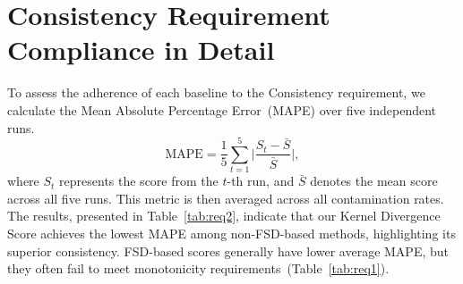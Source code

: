 
\section{Consistency Requirement Compliance in Detail}
To assess the adherence of each baseline to the Consistency requirement, we calculate the Mean Absolute Percentage Error~(MAPE) over five independent runs. 
\begin{equation*}
    \text{MAPE} = \frac{1}{5} \sum_{t=1}^5 \bigg\vert\frac{S_t - \bar{S}}{\bar{S}}\bigg\vert,
\end{equation*}
where $S_t$ represents the score from the $t$-th run, and $\bar{S}$ denotes the mean score across all five runs. 
This metric is then averaged across all contamination rates. 
The results, presented in Table~\ref{tab:req2}, indicate that our Kernel Divergence Score achieves the lowest MAPE among non-FSD-based methods, highlighting its superior consistency.
FSD-based scores generally have lower average MAPE, but they often fail to meet monotonicity requirements~(Table~\ref{tab:req1}).


